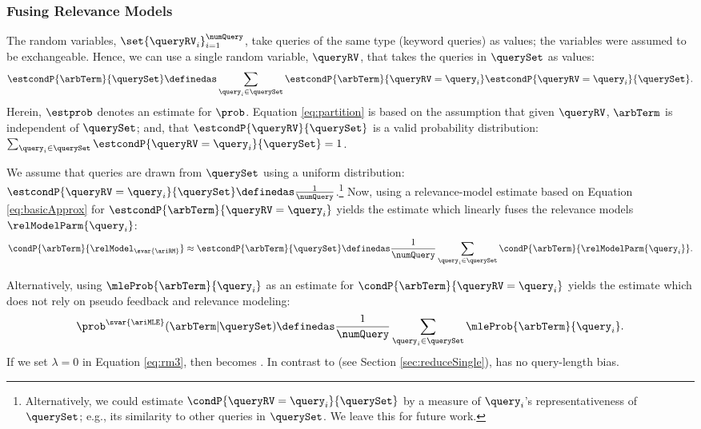 \subsubsection{Fusing Relevance Models}
\label{sec:fuseRelModels}
The random variables, $\set{\queryRV_i}_{i=1}^{\numQuery}$, take
queries of the same type (keyword queries) as values; the variables
were assumed to be exchangeable.
Hence, we can use a single random variable, $\queryRV$, that takes
the queries in $\querySet$ as values:
\begin{equation}
\label{eq:partition}
\estcondP{\arbTerm}{\querySet} \definedas \sum_{\query_i \in \querySet} \estcondP{\arbTerm}{\queryRV = \query_i}\estcondP{\queryRV = \query_i}{\querySet}.
\end{equation}
Herein, $\estprob$ denotes an estimate for $\prob$.
Equation \ref{eq:partition} is based on the assumption that given $\queryRV$, $\arbTerm$ is independent of $\querySet$; and, that
$\estcondP{\queryRV}{\querySet}$ is a valid probability distribution:
$\sum_{\query_i \in \querySet} \estcondP{\queryRV =
\query_i}{\querySet} = 1$.

We assume that queries are drawn from $\querySet$ using a uniform
distribution: $\estcondP{\queryRV =
\query_i}{\querySet} \definedas
\frac{1}{\numQuery}$.\footnote{Alternatively, we could estimate
$\condP{\queryRV = \query_i}{\querySet}$ by a measure of $\query_i$'s
representativeness of $\querySet$; e.g., its similarity to other
queries in $\querySet$.
We leave this for future work.}
Now, using a relevance-model estimate based on Equation \ref{eq:basicApprox} for
$\estcondP{\arbTerm}{\queryRV = \query_i}$ yields the
\firstmention{\ariRM} estimate which linearly fuses the relevance models
$\relModelParm{\query_i}$:
\begin{equation}
\label{eq:arith}
\condP{\arbTerm}{\relModel_{\svar{\ariRM}}} \approx \estcondP{\arbTerm}{\querySet}   \definedas \frac{1}{\numQuery} \sum_{\query_i \in \querySet} \condP{\arbTerm} {\relModelParm{\query_i}}.
\end{equation}

Alternatively, using $\mleProb{\arbTerm}{\query_i}$ as an
estimate for $\condP{\arbTerm}{\queryRV=\query_i}$ yields
the \firstmention{\ariMLE} estimate which does not rely on pseudo
feedback and relevance modeling:
\begin{equation}
\label{eq:arithMLE}
\prob^{\svar{\ariMLE}}(\arbTerm|\querySet) \definedas \frac{1}{\numQuery} \sum_{\query_i \in \querySet} \mleProb{\arbTerm} {\query_i}.
\end{equation}
If we set $\lambda=0$ in Equation \ref{eq:rm3}, then \method{\ariRM} becomes
\method{\ariMLE}.
In contrast to \method{\conMLE} (see Section
\ref{sec:reduceSingle}), \method{\ariMLE} has no query-length
bias. 

